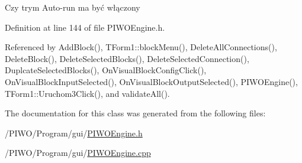 Czy trym Auto-run ma być włączony 

Definition at line 144 of file PIWOEngine.h.

Referenced by AddBlock(), TForm1::blockMenu(), DeleteAllConnections(), DeleteBlock(), DeleteSelectedBlocks(), DeleteSelectedConnection(), DuplcateSelectedBlocks(), OnVisualBlockConfigClick(), OnVisualBlockInputSelected(), OnVisualBlockOutputSelected(), PIWOEngine(), TForm1::Uruchom3Click(), and validateAll().

The documentation for this class was generated from the following files:\begin{CompactItemize}
\item 
/PIWO/Program/gui/\hyperlink{PIWOEngine_8h}{PIWOEngine.h}\item 
/PIWO/Program/gui/\hyperlink{PIWOEngine_8cpp}{PIWOEngine.cpp}\end{CompactItemize}

